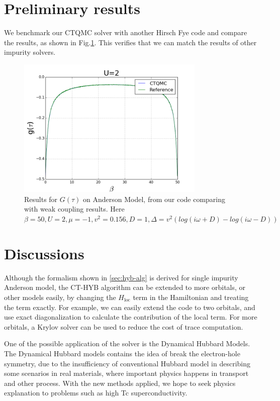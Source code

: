
\section{Preliminary results}
We benchmark our CTQMC solver with another Hirsch Fye code and compare the results,
as shown in Fig.\ref{fig:u2}. This verifies that we can match the results of 
other impurity solvers.

\begin{figure}
  \centering
  \label{fig:u2}
  \includegraphics[width=0.8\textwidth] {img/U=2.png}
  \caption{Results for $G(\tau)$ on Anderson Model, from our code comparing with
weak coupling results.
Here $\beta = 50, U = 2, \mu = −1, v^2 = 0.156, D = 1, \Delta = v^2(log(i\omega + D) − log(i\omega − D))$}
\end{figure}



\section{Discussions\label{sec:hyb-concl}}

Although the formalism shown in \ref{sec:hyb-alg} is derived for single 
impurity Anderson model, the CT-HYB algorithm can be extended to more orbitals,
or other models easily, by changing the $H_\textrm{loc}$ term in the Hamiltonian 
and treating the term exactly. For example, we can easily extend the code to two
orbitals, and use exact diagonalization to calculate the contribution of the 
local term. For more orbitals, a Krylov solver \cite{PhysRevB.80.235117} can be used to reduce the cost of
trace computation.

One of the possible application of the solver is the Dynamical Hubbard Models. 
The Dynamical Hubbard models contains the idea of break the electron-hole 
symmetry, due to the insufficiency of conventional Hubbard model in describing 
some scenarios in real materials, where important physics happens in transport 
and other process. With the new methods applied, we hope to seek physics 
explanation to problems such as high Tc superconductivity. 

